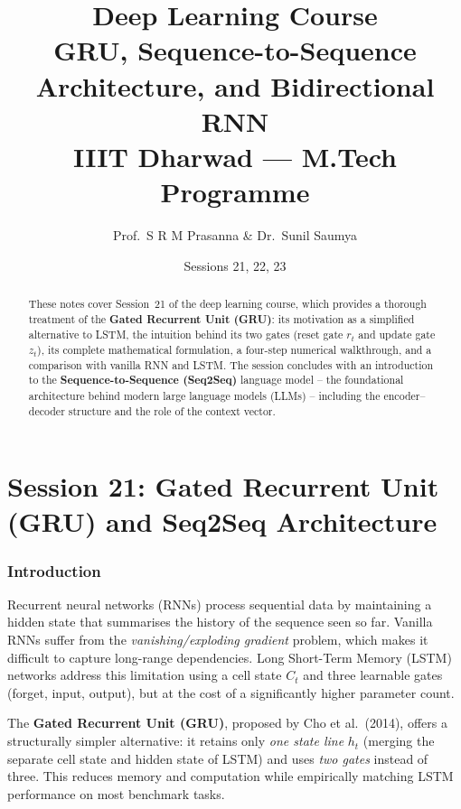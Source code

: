 \documentclass[12pt,a4paper]{article}
\title{%
  {\Large\bfseries Deep Learning Course}\\[6pt]
  {\LARGE GRU, Sequence-to-Sequence Architecture, and Bidirectional RNN}\\[4pt]
  {\normalsize IIIT Dharwad --- M.Tech Programme}
}
\author{Prof.\ S R M Prasanna \& Dr.\ Sunil Saumya}
\date{Sessions 21, 22, 23}
\begin{document}
\maketitle
\tableofcontents
\clearpage

\part{Session 21: Gated Recurrent Unit (GRU) and Seq2Seq Architecture}

\begin{abstract}
These notes cover Session~21 of the deep learning course, which provides a thorough treatment of the
\textbf{Gated Recurrent Unit (GRU)}: its motivation as a simplified alternative to LSTM, the intuition
behind its two gates (reset gate $r_t$ and update gate $z_t$), its complete mathematical formulation,
a four-step numerical walkthrough, and a comparison with vanilla RNN and LSTM. The session concludes
with an introduction to the \textbf{Sequence-to-Sequence (Seq2Seq)} language model -- the foundational
architecture behind modern large language models (LLMs) -- including the encoder--decoder structure
and the role of the context vector.
\end{abstract}

\newpage

\section{Introduction}
\label{sec:intro}

Recurrent neural networks (RNNs) process sequential data by maintaining a hidden state that summarises
the history of the sequence seen so far.  Vanilla RNNs suffer from the \emph{vanishing/exploding
gradient} problem, which makes it difficult to capture long-range dependencies.  Long Short-Term Memory
(LSTM) networks address this limitation using a cell state $C_t$ and three learnable gates (forget,
input, output), but at the cost of a significantly higher parameter count.

The \textbf{Gated Recurrent Unit (GRU)}, proposed by Cho et al.\ (2014), offers a structurally simpler
alternative: it retains only \emph{one state line} $h_t$ (merging the separate cell state and hidden
state of LSTM) and uses \emph{two gates} instead of three.  This reduces memory and computation while
empirically matching LSTM performance on most benchmark tasks.
\end{document}

